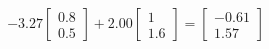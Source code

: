 \documentclass[preview]{standalone}
\begin{document}
\begin{align*}
-3.27 \begin{bmatrix} 0.8 \\ 0.5 \end{bmatrix} + 2.00 \begin{bmatrix} 1 \\ 1.6 \end{bmatrix} = \begin{bmatrix} -0.61 \\ 1.57 \end{bmatrix}
\end{align*}
\end{document}
